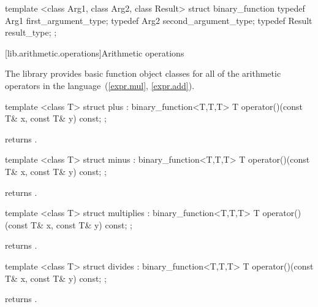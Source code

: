 %
\begin{codeblock}
template <class Arg1, class Arg2, class Result>
struct binary_function {
  typedef Arg1   first_argument_type;
  typedef Arg2   second_argument_type;
  typedef Result result_type;
};
\end{codeblock}

[lib.arithmetic.operations]{Arithmetic operations}

\pnum
The library provides basic function object classes for all of the arithmetic
operators in the language~(\ref{expr.mul}, \ref{expr.add}).

%
\begin{itemdecl}
template <class T> struct plus : binary_function<T,T,T> {
  T operator()(const T& x, const T& y) const;
};
\end{itemdecl}

\begin{itemdescr}
\pnum
{}
returns
.
\end{itemdescr}

%
\begin{itemdecl}
template <class T> struct minus : binary_function<T,T,T> {
  T operator()(const T& x, const T& y) const;
};
\end{itemdecl}

\begin{itemdescr}
\pnum
{}
returns
.
\end{itemdescr}

%
\begin{itemdecl}
template <class T> struct multiplies : binary_function<T,T,T> {
  T operator()(const T& x, const T& y) const;
};
\end{itemdecl}

\begin{itemdescr}
\pnum
{}
returns
.
\end{itemdescr}

%
\begin{itemdecl}
template <class T> struct divides : binary_function<T,T,T> {
  T operator()(const T& x, const T& y) const;
};
\end{itemdecl}

\begin{itemdescr}
\pnum
{}
returns
.
\end{itemdescr}

